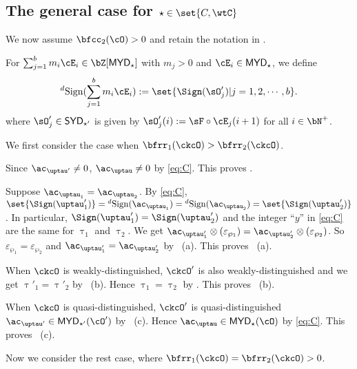 \documentclass[12pt,a4paper]{amsart}
\def\SYD{{\mathsf{SYD}}}
\def\MYD{{\mathsf{MYD}}}
\numberwithin{equation}{section}
\theoremstyle{remark}
\def\dsign{{}^d\mathrm{Sign}}
\begin{document}




\subsection{The general case for $\star\in \set{C,\wtC}$}
We now assume $\bfcc_{2}(\cO)>0$ and retain the notation in .

For $\sum_{j=1}^{b} m_{i} \cE_{i}\in \bZ[\MYD_{\star}]$ with $m_{j}>0$ and
$\cE_{i}\in \MYD_{\star}$, we define
\[
  \dsign(\sum_{j=1}^{b} m_{i} \cE_{i}) := \set{\Sign(\sO'_{j})|j=1,2,\cdots, b}.
\] where  $\sO'_{j} \in \SYD_{\star'}$ is given by $\sO'_{j}(i) := \sF\circ \cE_{j}(i+1)$ for all
$i\in \bN^{+}$.

\medskip

We first consider the case when $\bfrr_{1}(\ckcO)>\bfrr_{2}(\ckcO)$.

Since $\ac_{\uptau'}\neq 0$, $\ac_{\uptau}\neq 0$ by \eqref{eq:C}. This proves .


\smallskip


Suppose $\ac_{\uptau_{1}}=\ac_{\uptau_{2}}$. By \eqref{eq:C},
$\set{\Sign(\uptau'_{1})}=\dsign(\ac_{\uptau_{1}}) =\dsign(\ac_{\uptau_{2}}) = \set{\Sign(\uptau'_{2})}$.
In particular, $\Sign(\uptau'_{1})=\Sign(\uptau'_{2})$ and the integer ``$y$'' in \eqref{eq:C} are the same for $\uptau_{1}$
and $\uptau_{2}$. We get
$\ac_{\uptau'_{1}}\otimes (\varepsilon_{\wp_{1}})=\ac_{\uptau'_{2}}\otimes (\varepsilon_{\wp_{2}})$.
So $\varepsilon_{\wp_{1}}=\varepsilon_{\wp_{2}}$ and $\ac_{\uptau'_{1}}=\ac_{\uptau'_{2}}$ by ~(a).
This proves ~(a).


\smallskip

When $\ckcO$ is weakly-distinguished, $\ckcO'$ is also weakly-distinguished and  we get $\uptau'_{1}=\uptau'_{2}$ by
~(b). Hence $\uptau_{1}=\uptau_{2}$ by . This
proves ~(b).


\smallskip


When $\ckcO$ is quasi-distinguished, $\ckcO'$ is quasi-distinguished
$\ac_{\uptau'}\in \MYD_{\star'}(\cO')$ by
~(c). Hence $\ac_{\uptau}\in \MYD_{\star}(\cO)$ by \eqref{eq:C}. This
proves ~(c).


\medskip

Now we consider the rest case, where $\bfrr_{1}(\ckcO)=\bfrr_{2}(\ckcO)>0$.
\end{document}
